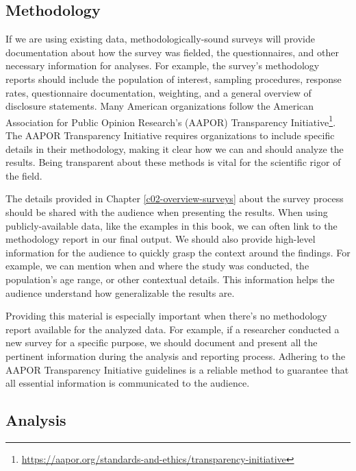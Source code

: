 \documentclass[
]{krantz}
\renewcommand{\href}[2]{#2\footnote{\url{#1}}}
\begin{document}
\hypertarget{methodology-1}{%
\subsection{Methodology}\label{methodology-1}}

If we are using existing data, methodologically-sound surveys will provide documentation about how the survey was fielded, the questionnaires, and other necessary information for analyses. For example, the survey's methodology reports should include the population of interest, sampling procedures, response rates, questionnaire documentation, weighting, and a general overview of disclosure statements. Many American organizations follow the American Association for Public Opinion Research's (AAPOR) \href{https://aapor.org/standards-and-ethics/transparency-initiative}{Transparency Initiative}. The AAPOR Transparency Initiative requires organizations to include specific details in their methodology, making it clear how we can and should analyze the results. Being transparent about these methods is vital for the scientific rigor of the field.

The details provided in Chapter \ref{c02-overview-surveys} about the survey process should be shared with the audience when presenting the results. When using publicly-available data, like the examples in this book, we can often link to the methodology report in our final output. We should also provide high-level information for the audience to quickly grasp the context around the findings. For example, we can mention when and where the study was conducted, the population's age range, or other contextual details. This information helps the audience understand how generalizable the results are.

Providing this material is especially important when there's no methodology report available for the analyzed data. For example, if a researcher conducted a new survey for a specific purpose, we should document and present all the pertinent information during the analysis and reporting process. Adhering to the AAPOR Transparency Initiative guidelines is a reliable method to guarantee that all essential information is communicated to the audience.

\hypertarget{analysis}{%
\subsection{Analysis}\label{analysis}}
\end{document}
